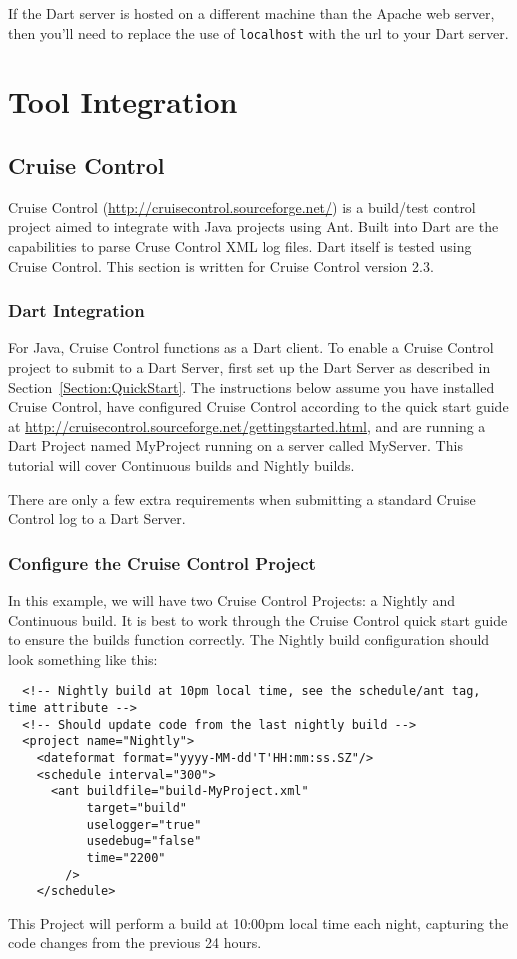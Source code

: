 \documentclass{InsightBook}
\begin{document}
If the Dart server is hosted on a different machine than the Apache
web server, then you'll need to replace the use of \texttt{localhost} with
the url to your Dart server.

\chapter{Tool Integration}
\section{Cruise Control}
Cruise Control (\url{http://cruisecontrol.sourceforge.net/}) is a
build/test control project aimed to integrate with Java projects using
Ant.  Built into Dart are the capabilities to parse Cruse Control XML
log files.  Dart itself is tested using Cruise Control.  This section
is written for Cruise Control version 2.3.

\subsection{Dart Integration}
For Java, Cruise Control functions as a Dart client.  To enable a
Cruise Control project to submit to a Dart Server, first set up the
Dart Server as described in Section~\ref{Section:QuickStart}.  The
instructions below assume you have installed Cruise Control, have
configured Cruise Control according to the quick start guide at
\url{http://cruisecontrol.sourceforge.net/gettingstarted.html}, and
are running a Dart Project named MyProject running on a server called
MyServer.  This tutorial will cover Continuous builds and Nightly builds.

There are only a few extra requirements when submitting a standard Cruise Control log
to a Dart Server.

\subsection{Configure the Cruise Control Project}
In this example, we will have two Cruise Control Projects: a Nightly
and Continuous build.  It is best to work through the Cruise Control quick start
guide to ensure the builds function correctly.  The Nightly build
configuration should look something like this:
\begin{verbatim}
  <!-- Nightly build at 10pm local time, see the schedule/ant tag, time attribute -->
  <!-- Should update code from the last nightly build -->
  <project name="Nightly">
    <dateformat format="yyyy-MM-dd'T'HH:mm:ss.SZ"/>
    <schedule interval="300"> 
      <ant buildfile="build-MyProject.xml"
           target="build"
           uselogger="true"
           usedebug="false"
           time="2200"
        />
    </schedule>
\end{verbatim}
This Project will perform a build at 10:00pm local time each night,
capturing the code changes from the previous 24 hours.
\end{document}
